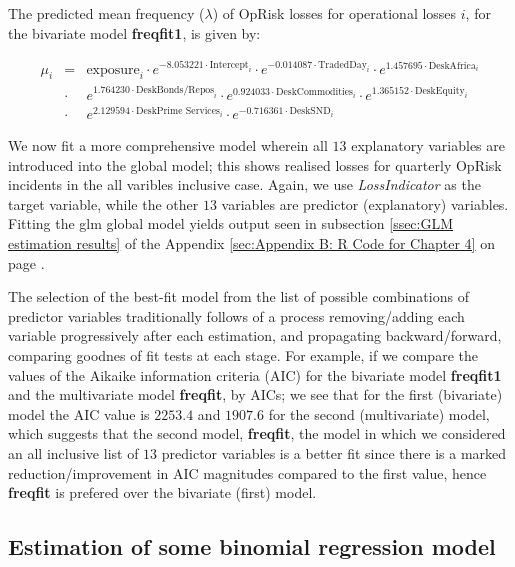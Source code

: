 \documentclass{DissertateUSU}
\begin{document}
The predicted mean frequency (\(\lambda\)) of OpRisk losses for
operational losses \(i\), for the bivariate model \textbf{freqfit1}, is
given by:

\singlespacing

\begin{eqnarray}
\mu_{i}& = &\mbox{exposure}_i\cdot e^{-8.053221\cdot \mbox{Intercept}_i}\cdot e^{-0.014087\cdot \mbox{TradedDay}_i}\cdot e^{1.457695\cdot \mbox{DeskAfrica}_i}\nonumber\\
&\cdot&e^{1.764230\cdot \mbox{DeskBonds/Repos}_i}\cdot e^{0.924033\cdot \mbox{DeskCommodities}_i}\cdot e^{1.365152\cdot \mbox{DeskEquity}_i}\nonumber\\
&\cdot& e^{2.129594\cdot \mbox{DeskPrime Services}_i}\cdot e^{-0.716361\cdot \mbox{DeskSND}_i}
\end{eqnarray} \doublespacing

We now fit a more comprehensive model wherein all \(13\) explanatory
variables are introduced into the global model; this shows realised
losses for quarterly OpRisk incidents in the all varibles inclusive
case. Again, we use \emph{LossIndicator} as the target variable, while
the other \(13\) variables are predictor (explanatory) variables.
Fitting the glm global model yields output seen in subsection
\ref{ssec:GLM estimation results} of the Appendix
\ref{sec:Appendix B: R Code for Chapter 4} on page \pageref{sec:Models}.

The selection of the best-fit model from the list of possible
combinations of predictor variables traditionally follows of a process
removing/adding each variable progressively after each estimation, and
propagating backward/forward, comparing goodnes of fit tests at each
stage. For example, if we compare the values of the Aikaike information
criteria (AIC) for the bivariate model \textbf{freqfit1} and the
multivariate model \textbf{freqfit}, by AICs; we see that for the first
(bivariate) model the AIC value is \(2253.4\) and \(1907.6\) for the
second (multivariate) model, which suggests that the second model,
\textbf{freqfit}, the model in which we considered an all inclusive list
of \(13\) predictor variables is a better fit since there is a marked
reduction/improvement in AIC magnitudes compared to the first value,
hence \textbf{freqfit} is prefered over the bivariate (first) model.

\singlespacing

\doublespacing

\subsection{Estimation of some binomial regression model}
\end{document}
